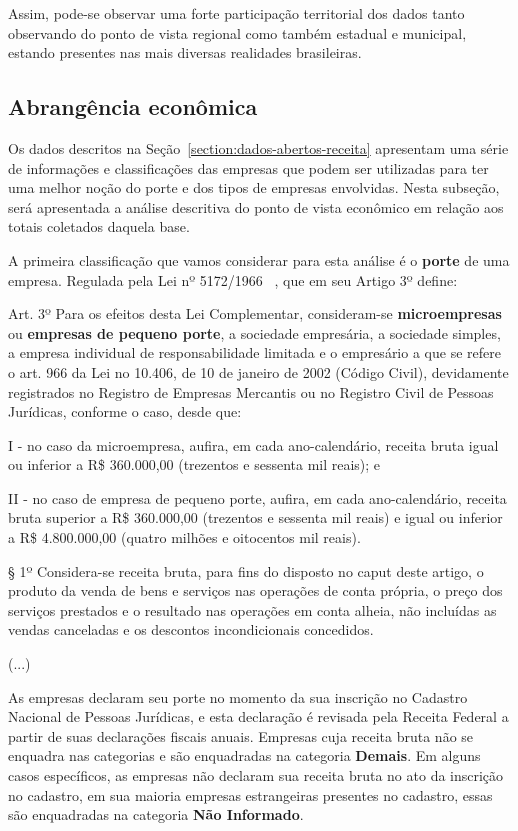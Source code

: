 Assim, pode-se observar uma forte participação territorial dos dados tanto observando do ponto de vista regional como também estadual e municipal, estando presentes nas mais diversas realidades brasileiras.

\subsection{Abrangência econômica}

Os dados descritos na Seção~\ref{section:dados-abertos-receita} apresentam uma série de informações e classificações das empresas que podem ser utilizadas para ter uma melhor noção do porte e dos tipos de empresas envolvidas. Nesta subseção, será apresentada a análise descritiva do ponto de vista econômico em relação aos totais coletados daquela base.

A primeira classificação que vamos considerar para esta análise é o \textbf{porte} de uma empresa. Regulada pela Lei nº 5172/1966 ~\cite{lei:5172:codigo-tributario}, que em seu Artigo 3º define:

\begin{citacao}
Art. 3º Para os efeitos desta Lei Complementar, consideram-se \textbf{microempresas} ou \textbf{empresas de pequeno porte}, a sociedade empresária, a sociedade simples, a empresa individual de responsabilidade limitada e o empresário a que se refere o art. 966 da Lei no 10.406, de 10 de janeiro de 2002 (Código Civil), devidamente registrados no Registro de Empresas Mercantis ou no Registro Civil de Pessoas Jurídicas, conforme o caso, desde que:

I - no caso da microempresa, aufira, em cada ano-calendário, receita bruta igual ou inferior a R\$ 360.000,00 (trezentos e sessenta mil reais); e

II - no caso de empresa de pequeno porte, aufira, em cada ano-calendário, receita bruta superior a R\$ 360.000,00 (trezentos e sessenta mil reais) e igual ou inferior a R\$ 4.800.000,00 (quatro milhões e oitocentos mil reais).

§ 1º  Considera-se receita bruta, para fins do disposto no caput deste artigo, o produto da venda de bens e serviços nas operações de conta própria, o preço dos serviços prestados e o resultado nas operações em conta alheia, não incluídas as vendas canceladas e os descontos incondicionais concedidos.

(...)
\end{citacao}

As empresas declaram seu porte no momento da sua inscrição no Cadastro Nacional de Pessoas Jurídicas, e esta declaração é revisada pela Receita Federal a partir de suas declarações fiscais anuais. Empresas cuja receita bruta não se enquadra nas categorias  e  são enquadradas na categoria \textbf{Demais}. Em alguns casos específicos, as empresas não declaram sua receita bruta no ato da inscrição no cadastro, em sua maioria empresas estrangeiras presentes no cadastro, essas são enquadradas na categoria \textbf{Não Informado}.

